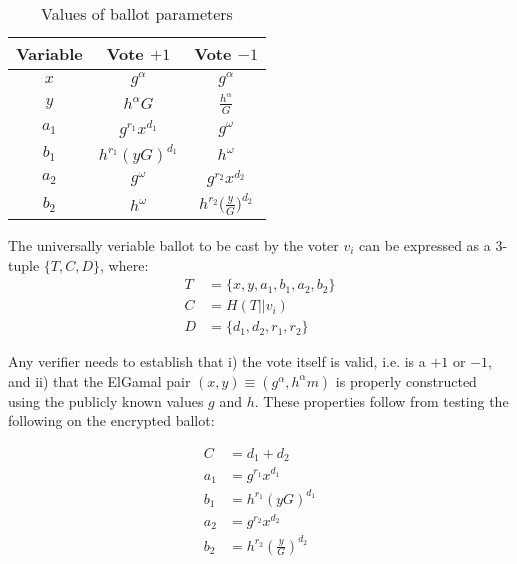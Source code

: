 \begin{table}[t]
\caption{Values of ballot parameters}
\begin{center}
  \begin{tabular}{c|c|c} 
    Variable & Vote $+1$ & Vote $-1$ \\\hline
    $x$   &  $g^\alpha$ &   $g^\alpha$ \\
    $y$   &  $h^\alpha G$ & $\frac{h^\alpha}{G}$  \\
    $a_1$ &  $g^{r_1}x^{d_1}$ & $g^\omega$  \\
    $b_1$ &  $h^{r_1}(yG)^{d_1}$ & $h^\omega$  \\
    $a_2$ &  $g^\omega$ &  $g^{r_2}x^{d_2}$ \\
    $b_2$ &  $h^\omega$ & $h^{r_2} \big( \frac{y}{G} \big)^{d_2}$ \\
\end{tabular}
\label{table:ballotparams}
\end{center}
\end{table}



The universally veriable ballot to be cast by the voter $v_i$
can be expressed as a 3-tuple $\{T,C,D\}$, where:
\begin{equation} \label{eq3}
\begin{split}
T & = \{ x, y, a_1, b_1, a_2, b_2 \} \\
C & = H( T || v_i ) \\
D & = \{d_1, d_2, r_1, r_2 \} 
\end{split}
\end{equation}

Any verifier needs to establish that i)
the vote itself is valid, i.e. is a $+1$ or $-1$, and ii) that the ElGamal
pair $(x,y) \equiv (g^\alpha, h^\alpha m)$ is properly constructed using the
publicly known values $g$ and $h$.  These properties follow from testing
the following on the encrypted ballot:

\begin{equation} \label{eq4}
\begin{split}
C & = d_1 + d_2  \\
a_1 & = g^{r_1} x^{d_1}  \\
b_1 & = h^{r_1} (yG)^{d_1} \\
a_2 & = g^{r_2} x^{d_2} \\
b_2 & = h^{r_2}(\frac{y}{G})^{d_2} \\
\end{split}
\end{equation}


